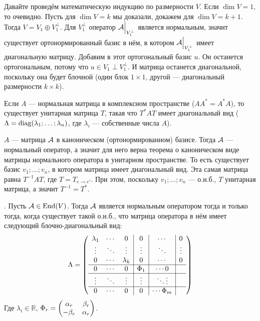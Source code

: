 \documentclass{article}
\begin{document}
\begin{itemize}
\begin{Proof}
            Давайте проведём математическую индукцию по размерности $V$. Если $\dim V=1$, то очевидно. Пусть для $\dim V=k$ мы доказали, докажем для $\dim V=k+1$. Тогда $V=V_1\oplus V_1^\perp$. Для $V_1^\perp$ оператор $\scriptA\Big|_{V_1^\perp}$ является нормальным, значит существует ортонормированный базис в нём, в котором $\scriptA\Big|_{V_1^\perp}$ имеет диагональную матрицу. Добавим в этот ортогональный базис $u$. Он останется ортогональным, потому что $u\in V_1\perp V_1^\perp$. И матрица останется диагональной, поскольку она будет блочной (один блок $1\times 1$, другой --- диагональный размерности $k\times k$).
        \end{Proof}
        \thm Если $A$ --- нормальная матрица в комплексном пространстве ($AA^*=A^*A$), то существует унитарная матрица $T$, такая что $T^*AT$ имеет диагональный вид ($\Lambda=\diag(\lambda_1;\ldots;\lambda_n)$, где $\lambda_i$ --- собственные числа $A$).
        \begin{Proof}
            $A$ --- матрица $\scriptA$ в каноническом (ортонормированном) базисе. Тогда $\scriptA$ --- нормальный оператор, а значит для него верна теорема о каноническом виде матрицы нормального оператора в унитарном пространстве. То есть существует базис $v_1;\ldots;v_n$, в котором матрица имеет диагональный вид. Эта самая матрица равна $T^{-1}AT$, где $T=T_{e\to e'}$. При этом, поскольку $v_1;\ldots;v_n$ --- о.н.б., $T$ унитарная матрица, а значит $T^{-1}=T^*$.
        \end{Proof}
        \thm {}. Пусть $\scriptA\in\End(V)$. Тогда $\scriptA$ является нормальным оператором тогда и только тогда, когда существует такой о.н.б., что матрица оператора в нём имеет следующий блочно-диагональный вид:
        $$
        \Lambda=\arr{ccc|c|c|c}{
            \lambda_1 & \cdots & 0 & 0 & \cdots & 0\\
            \vdots & \ddots & \vdots & \vdots & \ddots & \vdots\\
            0 & \cdots & \lambda_k & 0 & \cdots & 0\\
            \hline
            0 & \cdots & 0 & \Phi_1 & \cdots 0\\
            \hline
            \vdots & \ddots & \vdots & \vdots & \ddots \vdots\\
            \hline
            0 & \cdots & 0 & 0 & \cdots \Phi_m\\
        }
        $$
        Где $\lambda_i\in\mathbb R$, $\Phi_r=\matr{\alpha_r & \beta_r\\-\beta_r & \alpha_r}$.

\end{itemize}
\end{document}
